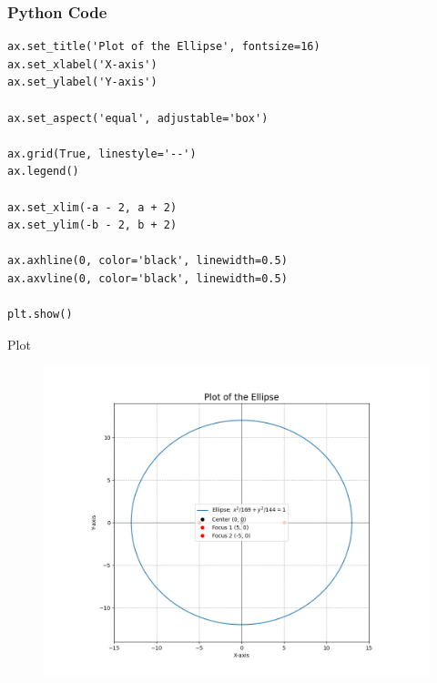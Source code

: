 \documentclass{beamer}
\begin{document}
\begin{frame}[fragile]
    \frametitle{Python Code}
    \begin{lstlisting}
ax.set_title('Plot of the Ellipse', fontsize=16)
ax.set_xlabel('X-axis')
ax.set_ylabel('Y-axis')

ax.set_aspect('equal', adjustable='box')

ax.grid(True, linestyle='--')
ax.legend()

ax.set_xlim(-a - 2, a + 2)
ax.set_ylim(-b - 2, b + 2)

ax.axhline(0, color='black', linewidth=0.5)
ax.axvline(0, color='black', linewidth=0.5)

plt.show()
    \end{lstlisting}
\end{frame}

\begin{frame}{Plot}
    \begin{figure}[h!]
    \begin{center}
    \includegraphics[width=\columnwidth]{figs/fig3.png}
    \end{center}
    \label{fig:Fig.1}
    \end{figure}
\end{frame}    
\end{document}
